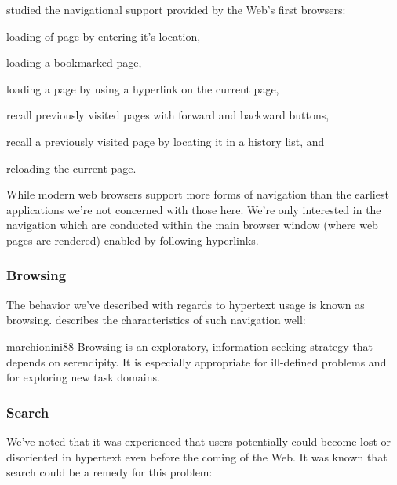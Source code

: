 \citet{jones96} studied the navigational support provided by the Web's first
browsers:
\begin{inparaenum}[(i)]
  \item loading of page by entering it's location,
  \item loading a bookmarked page,
  \item loading a page by using a hyperlink on the current page,
  \item recall previously visited pages with forward and backward buttons,
  \item recall a previously visited page by locating it in a history list, and
  \item reloading the current page.
\end{inparaenum}
While modern web browsers support more forms of navigation%
than the earliest applications we're not concerned with those here.
We're only interested in the navigation which are conducted within the main
browser window (where web pages are rendered) enabled by following hyperlinks.

\subsubsection{Browsing}
The behavior we've described with regards to hypertext usage is known as
browsing. \citeauthor{marchionini88} describes the characteristics of such navigation well:

\begin{citequote}[p.~71]{marchionini88}
  Browsing is an exploratory, information-seeking
  strategy that depends on serendipity. It is
  especially appropriate for ill-defined problems
  and for exploring new task domains.
\end{citequote}

\subsubsection{Search}
\label{section:background.navigation.navigation.on.the.web.search}
We've noted that it was experienced that users potentially could become lost
or disoriented in hypertext even before the coming of the Web. It was known
that search could be a remedy for this problem:

